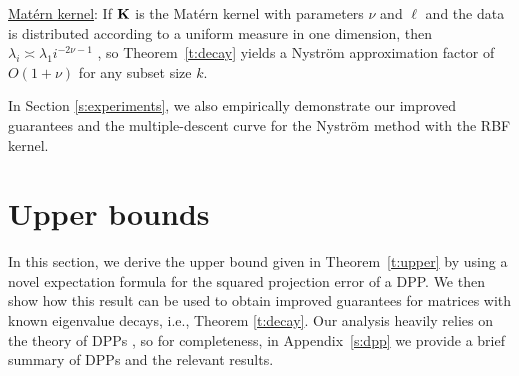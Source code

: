 \documentclass{article}
\begin{document}
  \underline{Mat\'ern kernel}: If $\mathbf K$ is the Mat\'ern kernel with
  parameters $\nu$ and $\ell$ and the data is distributed according to a
  uniform measure in one dimension,
  then $\lambda_i\asymp \lambda_1 i^{-2\nu-1}$
  \citep{RasmussenWilliams06}, so Theorem~\ref{t:decay} yields a
  Nystr\"om approximation factor of $O(1+\nu)$ for any subset size
  $k$.

In Section \ref{s:experiments}, we also empirically
demonstrate our improved guarantees and the multiple-descent curve for the Nystr\"om method with the
RBF kernel.


\section{Upper bounds}\label{s:upper}\vspace{-2mm}
In this section, we derive the upper bound given in
Theorem~\ref{t:upper} by using a novel expectation formula for the squared
projection error of a DPP. We then show
how this result can be used to 
obtain improved guarantees for matrices with known eigenvalue decays,
i.e., Theorem \ref{t:decay}. Our analysis heavily relies on the theory
of DPPs \citep{dpps-in-randnla}, so for completeness, in Appendix~\ref{s:dpp} we provide a
brief summary of DPPs and the relevant results.  
\end{document}
